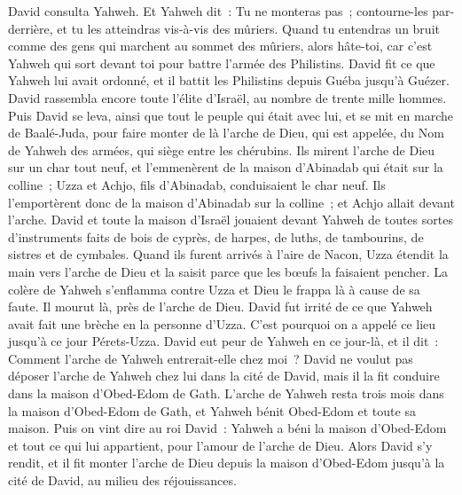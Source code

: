 \begin{multicols}{2}
David consulta Yahweh. Et Yahweh dit~: Tu ne monteras pas~; contourne-les par-derrière, et tu les atteindras vis-à-vis des mûriers.
Quand tu entendras un bruit comme des gens qui marchent au sommet des mûriers, alors hâte-toi, car c'est Yahweh qui sort devant toi pour battre l'armée des Philistins.
David fit ce que Yahweh lui avait ordonné, et il battit les Philistins depuis Guéba jusqu'à Guézer.
\VerseOne{}David rassembla encore toute l'élite d'Israël, au nombre de trente mille hommes.
Puis David se leva, ainsi que tout le peuple qui était avec lui, et se mit en marche de Baalé-Juda, pour faire monter de là l'arche de Dieu, qui est appelée, du Nom de Yahweh des armées, qui siège entre les chérubins.
Ils mirent l'arche de Dieu sur un char tout neuf, et l'emmenèrent de la maison d'Abinadab qui était sur la colline~; Uzza et Achjo, fils d'Abinadab, conduisaient le char neuf.
Ils l'emportèrent donc de la maison d'Abinadab sur la colline~; et Achjo allait devant l'arche.
David et toute la maison d'Israël jouaient devant Yahweh de toutes sortes d'instruments faits de bois de cyprès, de harpes, de luths, de tambourins, de sistres et de cymbales.
Quand ils furent arrivés à l'aire de Nacon, Uzza étendit la main vers l'arche de Dieu et la saisit parce que les bœufs la faisaient pencher.
La colère de Yahweh s'enflamma contre Uzza et Dieu le frappa là à cause de sa faute. Il mourut là, près de l'arche de Dieu.
David fut irrité de ce que Yahweh avait fait une brèche en la personne d'Uzza. C'est pourquoi on a appelé ce lieu jusqu'à ce jour Pérets-Uzza.
David eut peur de Yahweh en ce jour-là, et il dit~: Comment l'arche de Yahweh entrerait-elle chez moi~?
David ne voulut pas déposer l'arche de Yahweh chez lui dans la cité de David, mais il la fit conduire dans la maison d'Obed-Edom de Gath.
L'arche de Yahweh resta trois mois dans la maison d'Obed-Edom de Gath, et Yahweh bénit Obed-Edom et toute sa maison.
Puis on vint dire au roi David~: Yahweh a béni la maison d'Obed-Edom et tout ce qui lui appartient, pour l'amour de l'arche de Dieu. Alors David s'y rendit, et il fit monter l'arche de Dieu depuis la maison d'Obed-Edom jusqu'à la cité de David, au milieu des réjouissances.

\end{multicols}
